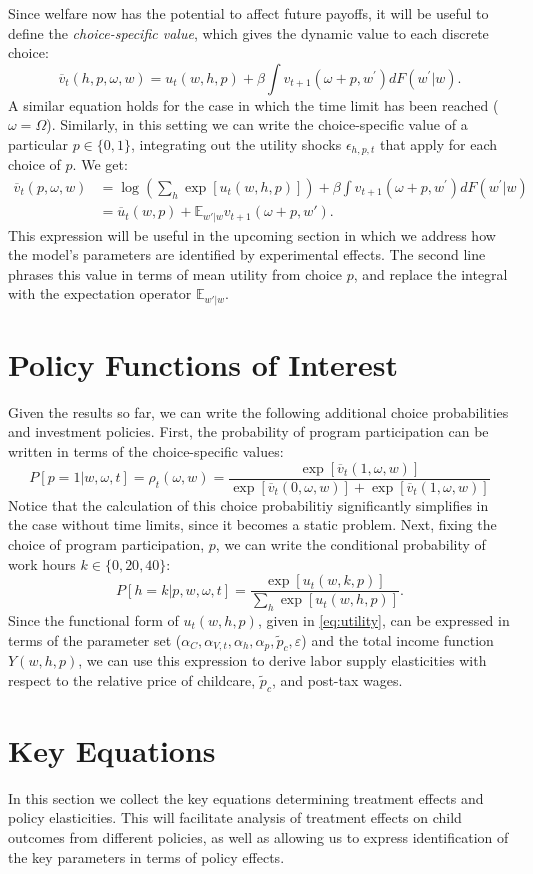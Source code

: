 \documentclass[12pt]{article}
\newcommand\ov{\overline}
\newcommand\EE{\mathbb{E}}
\newcommand\eps{\epsilon}
\numberwithin{equation}{section}
\numberwithin{figure}{section}
\numberwithin{table}{section}
\begin{document}
Since welfare now has the potential to affect future payoffs, it will be useful to define the \emph{choice-specific value}, which gives the dynamic value to each discrete choice:
\[\ov{v}_t(h,p,\omega,w) = u_{t}(w,h,p) + \beta\int v_{t+1}(\omega+p,w^\prime)dF(w^\prime|w).\]
A similar equation holds for the case in which the time limit has been reached ($\omega=\Omega$). Similarly, in this setting we can write the choice-specific value of a particular $p\in\{0,1\}$, integrating out the utility shocks $\eps_{h,p,t}$ that apply for each choice of $p$. We get:
\begin{align*}
\ov{v}_t(p,\omega,w) &= \log\left(\sum_h\exp[u_{t}(w,h,p)]\right) + \beta\int v_{t+1}(\omega+p,w^\prime)dF(w^\prime|w) \\
&= \ov{u}_t(w,p) + \EE_{w'|w}v_{t+1}(\omega+p,w').
\end{align*}
This expression will be useful in the upcoming section in which we address how the model's parameters are identified by experimental effects. The second line phrases this value in terms of mean utility from choice $p$, and replace the integral with the expectation operator $\EE_{w'|w}$.

\section{Policy Functions of Interest}
Given the results so far, we can write the following additional choice probabilities and investment policies. First, the probability of program participation can be written in terms of the choice-specific values:
\[P[p=1|w,\omega,t] = \rho_t(\omega,w) = \frac{\exp[\ov{v}_t(1,\omega,w)]}{\exp[\ov{v}_t(0,\omega,w)]+\exp[\ov{v}_t(1,\omega,w)]} \]
Notice that the calculation of this choice probabilitiy significantly simplifies in the case without time limits, since it becomes a static problem. Next, fixing the choice of program participation, $p$, we can write the conditional probability of work hours $k\in\{0,20,40\}$:
\[P[h=k|p,w,\omega,t] = \frac{\exp[u_t(w,k,p)]}{\sum_h\exp[u_t(w,h,p)]}. \]
Since the functional form of $u_t(w,h,p)$, given in \eqref{eq:utility}, can be expressed in terms of the parameter set ($\alpha_C,\alpha_{V,t},\alpha_h,\alpha_p,\tilde{p}_c,\varepsilon$) and the total income function $Y(w,h,p)$, we can use this expression to derive labor supply elasticities with respect to the relative price of childcare, $\tilde{p}_c$, and post-tax wages.


\section{Key Equations}
In this section we collect the key equations determining treatment effects and policy elasticities. This will facilitate analysis of treatment effects on child outcomes from different policies, as well as allowing us to express identification of the key parameters in terms of policy effects.
\end{document}
